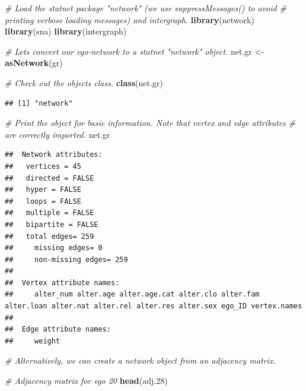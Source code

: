 \documentclass[
]{book}
\newenvironment{Shaded}{\begin{snugshade}}{\end{snugshade}}
\newcommand{\CommentTok}[1]{\textcolor[rgb]{0.56,0.35,0.01}{\textit{#1}}}
\newcommand{\FloatTok}[1]{\textcolor[rgb]{0.00,0.00,0.81}{#1}}
\newcommand{\FunctionTok}[1]{\textcolor[rgb]{0.13,0.29,0.53}{\textbf{#1}}}
\newcommand{\NormalTok}[1]{#1}
\newcommand{\OtherTok}[1]{\textcolor[rgb]{0.56,0.35,0.01}{#1}}
\begin{document}
\begin{Shaded}
\begin{Highlighting}[]
\CommentTok{\# Load the statnet package "network" (we use suppressMessages() to avoid}
\CommentTok{\# printing verbose loading messages) and intergraph.}
\FunctionTok{library}\NormalTok{(network)}
\FunctionTok{library}\NormalTok{(sna)}
\FunctionTok{library}\NormalTok{(intergraph)}

\CommentTok{\# Let\textquotesingle{}s convert our ego{-}network to a statnet "network" object.}
\NormalTok{net.gr }\OtherTok{\textless{}{-}} \FunctionTok{asNetwork}\NormalTok{(gr)}

\CommentTok{\# Check out the object\textquotesingle{}s class.}
\FunctionTok{class}\NormalTok{(net.gr)}
\end{Highlighting}
\end{Shaded}

\begin{verbatim}
## [1] "network"
\end{verbatim}

\begin{Shaded}
\begin{Highlighting}[]
\CommentTok{\# Print the object for basic information. Note that vertex and edge attributes}
\CommentTok{\# are correctly imported.}
\NormalTok{net.gr}
\end{Highlighting}
\end{Shaded}

\begin{verbatim}
##  Network attributes:
##   vertices = 45 
##   directed = FALSE 
##   hyper = FALSE 
##   loops = FALSE 
##   multiple = FALSE 
##   bipartite = FALSE 
##   total edges= 259 
##     missing edges= 0 
##     non-missing edges= 259 
## 
##  Vertex attribute names: 
##     alter_num alter.age alter.age.cat alter.clo alter.fam alter.loan alter.nat alter.rel alter.res alter.sex ego_ID vertex.names 
## 
##  Edge attribute names: 
##     weight
\end{verbatim}

\begin{Shaded}
\begin{Highlighting}[]
\CommentTok{\# Alternatively, we can create a network object from an adjacency matrix.}

\CommentTok{\# Adjacency matrix for ego 20}
\FunctionTok{head}\NormalTok{(adj}\FloatTok{.28}\NormalTok{)}
\end{Highlighting}
\end{Shaded}
\end{document}
